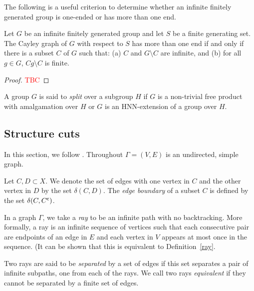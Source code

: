 The following is a useful criterion to determine whether an infinite finitely generated group is one-ended or has more than one end.
\begin{proposition} 
Let \(G\) be an infinite finitely generated group and let \(S\) be a  finite generating set.
The Cayley graph of \(G\) with respect to \(S\) has more than one end if and only if there is a subset \(C\) of \(G\) such that:
    (a) \(C\) and \(G \setminus C\) are infinite, and
    (b) for all \(g \in G\), \(Cg \setminus C\) is finite.
\end{proposition}

\begin{proof}
    \textcolor{red}{TBC}
\end{proof}

A group \(G\) is said to \emph{split} over a subgroup \(H\) if \(G\) is a non-trivial free product with amalgamation over \(H\) or \(G\) is an HNN-extension of a group over \(H\). 

\subsection{Structure cuts}

In this section, we follow \cite{K10}. Throughout \(\Gamma = (V,E)\) is an undirected, simple graph.

\begin{definition}
    Let \(C,D \subset X\). We denote the set of edges with one vertex in \(C\) and the other vertex in \(D\) by the set \(\delta(C,D)\). The \emph{edge boundary} of a subset \(C\) is defined by the set \(\delta(C, {C}^{\mathsf{c}})\).
\end{definition}

In a graph \(\Gamma\), we take a \emph{ray} to be an infinite path with no backtracking. More formally, a ray is an infinite sequence of vertices such that each consecutive pair are endpoints of an edge in \(E\) and each vertex in \(V\) appears at most once in the sequence. (It can be shown that this is equivalent to Definition~\ref{ray}. %

\begin{definition}
Two rays are said to be \emph{separated} by a set of edges if this set separates a pair of infinite subpaths, one from each of the rays. We call two rays \emph{equivalent} if they cannot be separated by a finite set of edges.
\end{definition}

